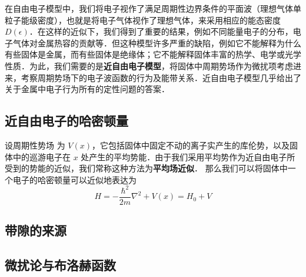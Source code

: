 

在自由电子模型中，我们将电子视作了满足周期性边界条件的平面波（理想气体单粒子能级密度），也就是将电子气体视作了理想气体，来采用相应的能态密度 $D(\epsilon)$．在这样的近似下，我们得到了重要的结果，例如不同能量电子的分布，电子气体对金属热容的贡献等．但这种模型许多严重的缺陷，例如它不能解释为什么有些固体是金属，而有些固体是绝缘体；它不能解释固体丰富的热学、电学或光学性质．为此，我们需要的是\textbf{近自由电子模型}，将固体中周期势场作为微扰项考虑进来，考察周期势场下的电子波函数的行为及能带关系．近自由电子模型几乎给出了关于金属中电子行为所有的定性问题的答案．
\subsection{近自由电子的哈密顿量}
设周期性势场 为 $V(x)$，它包括固体中固定不动的离子实产生的库伦势，以及固体中的巡游电子在 $x$ 处产生的平均势能．由于我们采用平均势作为近自由电子所受到的势能的近似，我们常称这种方法为\textbf{平均场近似}．
那么我们可以将固体中一个电子的哈密顿量可以近似地表达为
\begin{equation}
H=-\frac{\hbar^2}{2m}\nabla^2+V(x)=H_0+V
\end{equation}

\subsection{带隙的来源}
\subsection{微扰论与布洛赫函数}